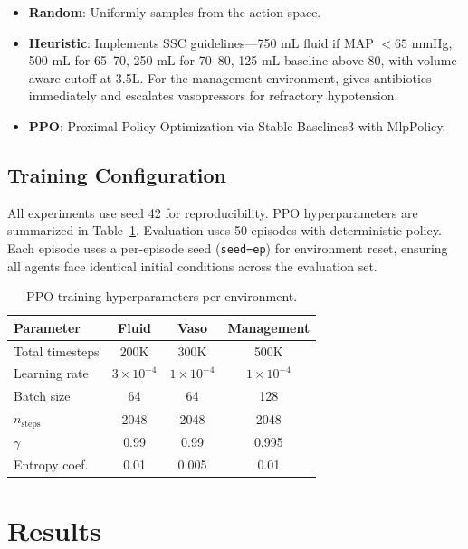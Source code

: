 \documentclass[11pt,a4paper]{article}
\begin{document}
\begin{itemize}
    \item \textbf{Random}: Uniformly samples from the action space.
    \item \textbf{Heuristic}: Implements SSC guidelines---750 mL fluid if MAP $< 65$ mmHg, 500 mL for 65--70, 250 mL for 70--80, 125 mL baseline above 80, with volume-aware cutoff at 3.5L. For the management environment, gives antibiotics immediately and escalates vasopressors for refractory hypotension.
    \item \textbf{PPO}: Proximal Policy Optimization \citep{schulman2017proximal} via Stable-Baselines3 \citep{raffin2021stable} with MlpPolicy.
\end{itemize}

\subsection{Training Configuration}

All experiments use seed 42 for reproducibility. PPO hyperparameters are summarized in Table~\ref{tab:hyperparams}. Evaluation uses 50 episodes with deterministic policy. Each episode uses a per-episode seed (\texttt{seed=ep}) for environment reset, ensuring all agents face identical initial conditions across the evaluation set.

\begin{table}[htbp]
\centering
\caption{PPO training hyperparameters per environment.}
\label{tab:hyperparams}
\begin{tabular}{lccc}
\toprule
\textbf{Parameter} & \textbf{Fluid} & \textbf{Vaso} & \textbf{Management} \\
\midrule
Total timesteps & 200K & 300K & 500K \\
Learning rate & $3 \times 10^{-4}$ & $1 \times 10^{-4}$ & $1 \times 10^{-4}$ \\
Batch size & 64 & 64 & 128 \\
$n_{\text{steps}}$ & 2048 & 2048 & 2048 \\
$\gamma$ & 0.99 & 0.99 & 0.995 \\
Entropy coef. & 0.01 & 0.005 & 0.01 \\
\bottomrule
\end{tabular}
\end{table}

\section{Results}
\end{document}

